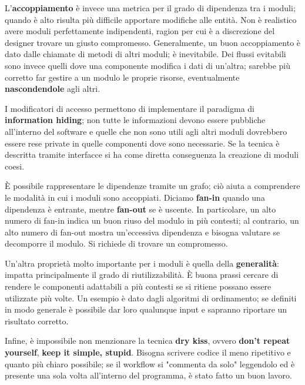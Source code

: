 L'\textbf{accoppiamento} è invece una metrica per il grado di dipendenza tra i moduli; quando è alto risulta più difficile apportare modifiche alle entità. Non è realistico avere moduli perfettamente indipendenti, ragion per cui è a discrezione del designer trovare un giusto compromesso. Generalmente, un buon accoppiamento è dato dalle chiamate di metodi di altri moduli; è inevitabile. Dei flussi evitabili sono invece quelli dove una componente modifica i dati di un'altra; sarebbe più corretto far gestire a un modulo le proprie risorse, eventualmente \textbf{nascondendole} agli altri.\par
I modificatori di accesso permettono di implementare il paradigma di \textbf{information hiding}; non tutte le informazioni devono essere pubbliche all'interno del software e quelle che non sono utili agli altri moduli dovrebbero essere rese private in quelle componenti dove sono necessarie. Se la tecnica è descritta tramite interfacce si ha come diretta conseguenza la creazione di moduli coesi.\newline

\noindent È possibile rappresentare le dipendenze tramite un grafo; ciò aiuta a comprendere le modalità in cui i moduli sono accoppiati. Diciamo \textbf{fan-in} quando una dipendenza è entrante, mentre \textbf{fan-out} se è uscente. In particolare, un alto numero di fan-in indica un buon riuso del modulo in più contesti; al contrario, un alto numero di fan-out mostra un'eccessiva dipendenza e bisogna valutare se decomporre il modulo. Si richiede di trovare un compromesso.\par
Un'altra proprietà molto importante per i moduli è quella della \textbf{generalità}: impatta principalmente il grado di riutilizzabilità. È buona prassi cercare di rendere le componenti adattabili a più contesti se si ritiene possano essere utilizzate più volte. Un esempio è dato dagli algoritmi di ordinamento; se definiti in modo generale è possibile dar loro qualunque input e sapranno riportare un risultato corretto.\par
Infine, è impossibile non menzionare la tecnica \textbf{dry kiss}, ovvero \textbf{don't repeat yourself}, \textbf{keep it simple, stupid}. Bisogna scrivere codice il meno ripetitivo e quanto più chiaro possibile; se il workflow si "commenta da solo" leggendolo ed è presente una sola volta all'interno del programma, è stato fatto un buon lavoro.